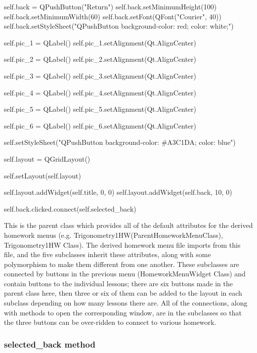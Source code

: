 \begin{python}
        self.back = QPushButton("Return")
        self.back.setMinimumHeight(100)
        self.back.setMinimumWidth(60)
        self.back.setFont(QFont("Courier", 40))
        self.back.setStyleSheet("QPushButton {background-color: red; color: white;}")

        self.pic_1 = QLabel()
        self.pic_1.setAlignment(Qt.AlignCenter)

        self.pic_2 = QLabel()
        self.pic_2.setAlignment(Qt.AlignCenter)
        
        self.pic_3 = QLabel()
        self.pic_3.setAlignment(Qt.AlignCenter)
        
        self.pic_4 = QLabel()
        self.pic_4.setAlignment(Qt.AlignCenter)

        self.pic_5 = QLabel()
        self.pic_5.setAlignment(Qt.AlignCenter)
        
        self.pic_6 = QLabel()
        self.pic_6.setAlignment(Qt.AlignCenter)

        self.setStyleSheet("QPushButton {background-color: #A3C1DA; color: blue}")   

        self.layout = QGridLayout()

        self.setLayout(self.layout)

        self.layout.addWidget(self.title, 0, 0)
        self.layout.addWidget(self.back, 10, 0)

        self.back.clicked.connect(self.selected_back)
\end{python}

This is the parent class which provides all of the default attributes for the derived homework menus (e.g. Trigonometry1HW(ParentHomeworkMenuClass), Trigonometry1HW Class). The derived homework menu file imports from this file, and the five subclasses inherit these attributes, along with some polymorphism to make them different from one another. These subclasses are connected by buttons in the previous menu (HomeworkMenuWidget Class) and contain buttons to the individual lessons; there are six buttons made in the parent class here, then three or six of them can be added to the layout in each subclass depending on how many lessons there are. All of the connections, along with methods to open the corresponding window, are in the subclasses so that the three buttons can be over-ridden to connect to various homework.

\subsubsection{selected\_back method}

